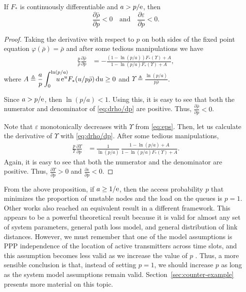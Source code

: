 \begin{proposition}\label{prop:p_opt}
    If $F_*$ is continuously differentiable and $a > p/\mathrm{e}$, then \[\dfrac{\partial\bar\rho}{\partial p} < 0 \quad\text{and}\quad \dfrac{\partial\varepsilon}{\partial p} < 0.\]
\end{proposition}
%
\begin{proof}
    Taking the derivative with respect to $p$ on both sides of the fixed point equation $\varphi(\bar\rho)=\bar\rho$ and after some tedious manipulations we have
    \begin{align} \label{eq:drho/dp}
        \frac{p}{\bar\rho} \frac{\partial\bar\rho}{\partial p}
            &= - \frac{(1-\ln(p/a))F_*(\Upsilon)+A}{1-\ln(p/a)F_*(\Upsilon) + A},
    \end{align}%
    where $\displaystyle A \triangleq \frac{a}{p}\int_0^{\ln(p/a)} \hspace{-7mm} u\, \euler^u F_*(u/p\bar\rho) \,\d u \ge 0$ and $\displaystyle \Upsilon \triangleq \frac{\ln(p/a)}{p\bar\rho}$.
    
    Since $a>p/\mathrm{e}$, then $\ln(p/a) < 1$. Using this, it is easy to see that both the numerator and denominator of \eqref{eq:drho/dp} are positive. Thus, $\frac{\partial\bar\rho}{\partial p} < 0$.
    
    Note that $\varepsilon$ monotonically decreases with $\Upsilon$ from \eqref{eq:eps}. Then, let us calculate the derivative of $\Upsilon$ with \eqref{eq:drho/dp}. After some tedious manipulations,
    \begin{align*}
        \frac{p}{\Upsilon}\frac{\partial\Upsilon}{\partial p} 
            &= \frac{1}{\ln(p/a)}\,\frac{1 - \ln(p/a)+A}{1 - \ln(p/a) F_*(\Upsilon) + A}.
    \end{align*}%
    Again, it is easy to see that both the numerator and the denominator are positive. Thus, $\frac{\partial\Upsilon}{\partial p} > 0$ and $\frac{\partial\varepsilon}{\partial p} < 0$.
\end{proof}

From the above proposition, if $a \ge 1/\mathrm{e}$, then the access probability $p$ that minimizes the proportion of unstable nodes and the load on the queues is $p=1$. Other works \cite{haenggi2018soc, dester2018} also reached an equivalent result in a different framework.
%
This appears to be a powerful theoretical result because it is valid for almost any set of system parameters, general path loss model, and general distribution of link distances.
%
However, we must remember that one of the model assumptions is PPP independence of the location of active transmitters across time slots, and this assumption becomes less valid as we increase the value of $p$ \cite{haenggi2013diversity}.
%
Thus, a more sensible conclusion is that, instead of setting $p=1$, we should increase $p$ as long as the system model assumptions remain valid.
%
Section~\ref{sec:counter-example} presents more material on this topic.

